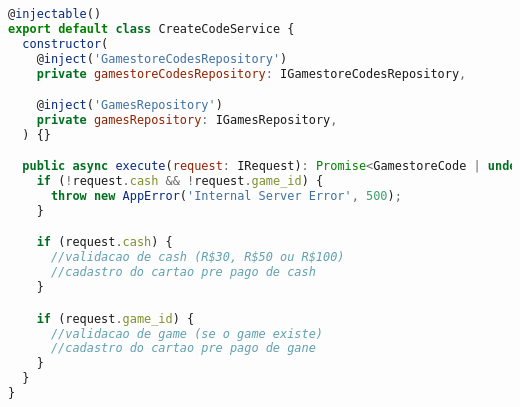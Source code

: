 \begin{lstlisting}[language=JavaScript, caption={Implementação de cadastro de códigos},captionpos=b, label=alg:createcodeservice]
@injectable()
export default class CreateCodeService {
  constructor(
    @inject('GamestoreCodesRepository')
    private gamestoreCodesRepository: IGamestoreCodesRepository,

    @inject('GamesRepository')
    private gamesRepository: IGamesRepository,
  ) {}

  public async execute(request: IRequest): Promise<GamestoreCode | undefined> {
    if (!request.cash && !request.game_id) {
      throw new AppError('Internal Server Error', 500);
    }

    if (request.cash) {
      //validacao de cash (R$30, R$50 ou R$100)
      //cadastro do cartao pre pago de cash
    }

    if (request.game_id) {
      //validacao de game (se o game existe)
      //cadastro do cartao pre pago de gane
    }
  }
}

\end{lstlisting}